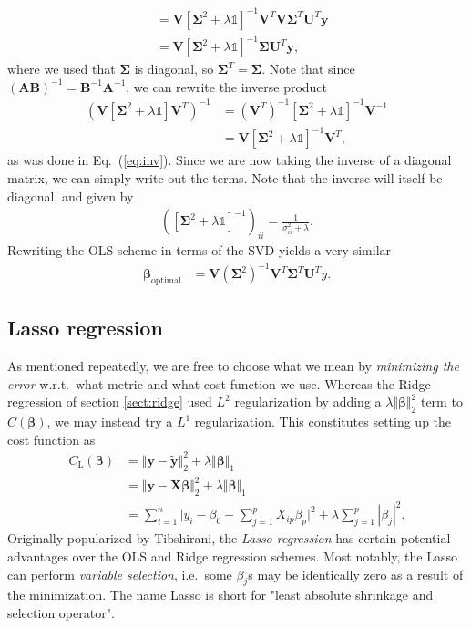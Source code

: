 \documentclass[a4paper]{article}
\newcommand{\eq} [1]{Eq.\ (\ref{eq:#1})}
\begin{document}
\begin{multicols}{2}
\begin{align}
%
&= \mathbf{V}\left[\bm\Sigma^2 +\lambda\mathds{1}\right]^{-1}\mathbf{V}^T \mathbf{V}\bm\Sigma^T \mathbf{U}^T \mathbf{y} \nonumber \\
%
&= \mathbf{V}\left[\bm\Sigma^2 +\lambda\mathds{1}\right]^{-1}\bm\Sigma \mathbf{U}^T \mathbf{y},
\end{align}
where we used that $\bm\Sigma$ is diagonal, so $\bm\Sigma^T =\bm\Sigma$. Note that since $(\mathbf{A}\mathbf{B})^{-1}=\mathbf{B}^{-1}\mathbf{A}^{-1}$, we can rewrite the inverse product 
\begin{align}
\left(\mathbf{V}\left[\bm\Sigma^2+\lambda\mathds{1}\right]\mathbf{V}^T\right)^{-1} &= \left(\mathbf{V}^T\right)^{-1} \left[\bm\Sigma^2+\lambda \mathds{1}\right]^{-1}\mathbf{V}^{-1} \nonumber \\
%
&= \mathbf{V}\left[\bm\Sigma^2+\lambda \mathds{1}\right]^{-1}\mathbf{V}^T, \nonumber
\end{align} 
as was done in \eq{inv}. Since we are now taking the inverse of a diagonal matrix, we can simply write out the terms. Note that the inverse will itself be diagonal, and given by
\begin{align}
\left(\left[\bm\Sigma^2+\lambda\mathds{1}\right]^{-1}\right)_{ii} = \frac{1}{\sigma_{ii}^2+\lambda}.
\end{align}
Rewriting the OLS scheme in terms of the SVD yields a very similar 
\begin{align}
\bm\beta_\text{optimal} &= \mathbf{V}\left(\bm\Sigma^2\right)^{-1}\mathbf{V}^T \bm\Sigma^T \mathbf{U}^Ty.
\end{align}

\subsection{Lasso regression}
As mentioned repeatedly, we are free to choose what we mean by \textit{minimizing the error} w.r.t.\ what metric and what cost function we use. Whereas the Ridge regression of section \ref{sect:ridge} used $L^2$ regularization by adding a $\lambda\Vert \bm\beta\Vert_2^2$ term to $C(\bm\beta)$, we may instead try a $L^1$ regularization. This constitutes setting up the cost function as
\begin{align}
C_\text{L}(\bm\beta) &= \Vert \mathbf{y} - \tilde{\mathbf{y}}\Vert_2^2 + \lambda \Vert \bm\beta \Vert_1 \nonumber \\
%
&= \Vert \mathbf{y} - \mathbf{X}\bm\beta\Vert_2^2 + \lambda \Vert \bm\beta \Vert_1 \nonumber \\
%
&= \sum_{i=1}^n\Big| y_i - \beta_0 - \sum_{j=1}^p X_{ip}\beta_p\Big|^2 + \lambda \sum_{j=1}^p |\beta_j|^2.
\end{align}
Originally popularized by Tibshirani\autocite{tibshirani1996regression}, the \textit{Lasso regression} has certain potential advantages over the OLS and Ridge regression schemes. Most notably, the Lasso can perform \textit{variable selection}, i.e.\ some $\beta_j$s may be identically zero as a result of the minimization. The name Lasso is short for "least absolute shrinkage and selection operator".


\end{multicols}
\end{document}
